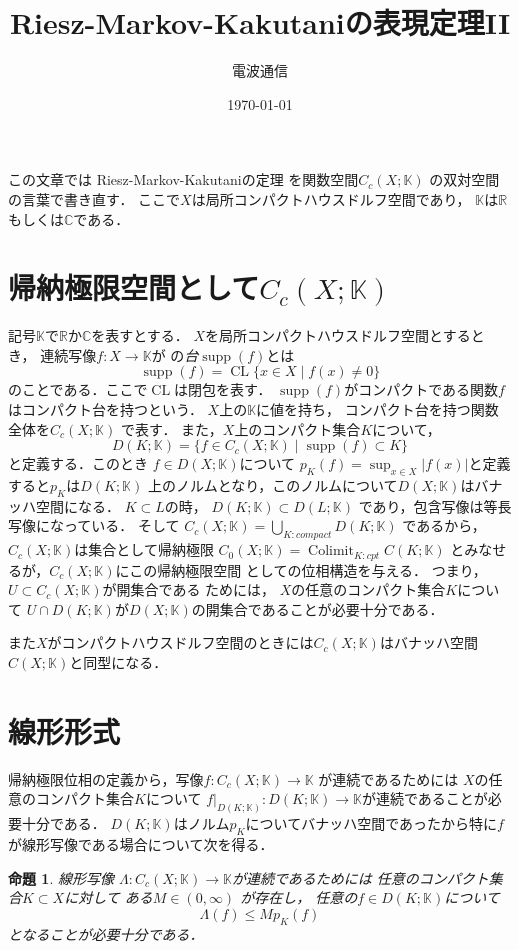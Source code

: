 \documentclass[leqno]{jsarticle}
\title{Riesz-Markov-Kakutaniの表現定理II}
\author{電波通信}
\date{\today}
\newtheorem{prop}[thm]{命題}
\newcommand{\rr}{\mathbb{R}}
\newcommand{\cc}{\mathbb{C}}
\DeclareMathOperator{\col}{Colimit}
\DeclareMathOperator{\supp}{supp}
\DeclareMathOperator{\cl}{CL}
\newcommand{\kk}{\mathbb{K}}
\begin{document}
\maketitle

この文章では
Riesz-Markov-Kakutaniの定理
を関数空間$C_c(X; \mathbb{K})$
の双対空間の言葉で書き直す．
ここで$X$は局所コンパクトハウスドルフ空間であり，
$\mathbb{K}$は$\rr$もしくは$\cc$である．

\section{帰納極限空間として$C_{c}(X;\mathbb{K})$}
記号$\mathbb{K}$で$\rr$か$\cc$を表すとする．
$X$を局所コンパクトハウスドルフ空間とするとき，
連続写像$f: X\to \mathbb{K}$が
の\emph{台}$\supp(f)$とは
\[
\supp(f)=\cl\{x\in X\mid f(x)\neq 0\}
\]
のことである．ここで$\cl$は閉包を表す．
$\supp(f)$がコンパクトである関数$f$はコンパクト台を持つという．
$X$上の$\mathbb{K}$に値を持ち，
コンパクト台を持つ関数全体を$C_c(X; \mathbb{K})$
で表す．
また，$X$上のコンパクト集合$K$について，
\[
D(K; \mathbb{K})=\{f\in C_c(X; \mathbb{K})\mid \supp(f)\subset K\}
\]
と定義する．このとき
$f\in D(X; \mathbb{K})$について
$p_K(f)=\sup_{x\in X}|f(x)|$と定義すると$p_K$は$D(K; \mathbb{K})$
上のノルムとなり，このノルムについて$D(X; \mathbb{K})$はバナッハ空間になる．
$K\subset L$の時，
$D(K; \mathbb{K})\subset D(L; \mathbb{K})$
であり，包含写像は等長写像になっている．
そして
$C_c(X;\mathbb{K})=\bigcup_{K: compact}D(K; \mathbb{K})$
であるから，$C_c(X; \mathbb{K})$は集合として帰納極限
$C_0(X;\mathbb{K})=\col_{K:cpt} C(K; \mathbb{K})$
とみなせるが，$C_c(X; \mathbb{K})$にこの帰納極限空間
としての位相構造を与える．
つまり，$U\subset C_c(X; \kk)$が開集合である
ためには，
$X$の任意のコンパクト集合$K$について
$U\cap D(K; \kk)$が$D(X; \kk)$の開集合であることが必要十分である．

また$X$がコンパクトハウスドルフ空間のときには$C_c(X; \kk)$はバナッハ空間
$C(X; \kk)$と同型になる．

\section{線形形式}
帰納極限位相の定義から，写像$f: C_c(X; \kk)\to \kk$
が連続であるためには
$X$の任意のコンパクト集合$K$について
$f|_{D(K;\kk)}: D(K; \kk)\to \kk$が連続であることが必要十分である．
$D(K; \kk)$はノルム$p_K$についてバナッハ空間であったから特に$f$が線形写像である場合について次を得る．
\begin{prop}
線形写像
$\Lambda:C_c(X;\mathbb{K})\to \kk$が連続であるためには
任意のコンパクト集合$K\subset X$に対して
ある$M\in (0, \infty)$
が存在し，
任意の$f\in D(K; \mathbb{K})$について
\[
\Lambda(f)\le Mp_K(f)
\]
となることが必要十分である．
\end{prop}
\end{document}
